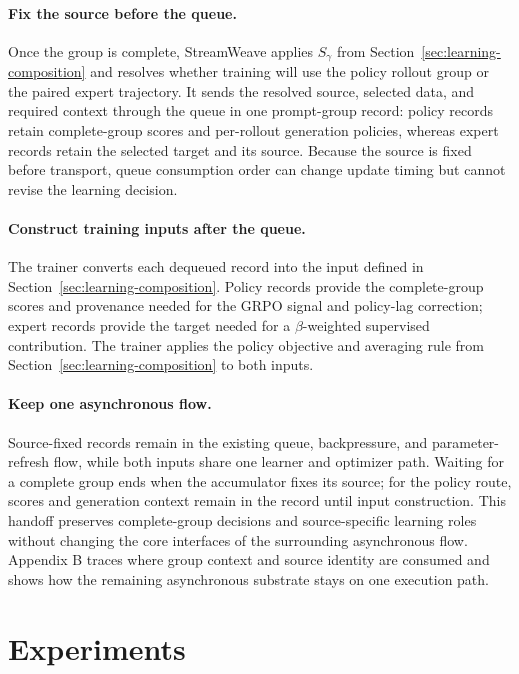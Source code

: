 \documentclass[letterpaper]{article}
\begin{document}
\paragraph{Fix the source before the queue.}
Once the group is complete, StreamWeave applies $S_\gamma$ from Section~\ref{sec:learning-composition} and resolves whether training will use the policy rollout group or the paired expert trajectory.
It sends the resolved source, selected data, and required context through the queue in one prompt-group record: policy records retain complete-group scores and per-rollout generation policies, whereas expert records retain the selected target and its source.
Because the source is fixed before transport, queue consumption order can change update timing but cannot revise the learning decision.

\paragraph{Construct training inputs after the queue.}
The trainer converts each dequeued record into the input defined in Section~\ref{sec:learning-composition}.
Policy records provide the complete-group scores and provenance needed for the GRPO signal and policy-lag correction; expert records provide the target needed for a $\beta$-weighted supervised contribution.
The trainer applies the policy objective and averaging rule from Section~\ref{sec:learning-composition} to both inputs.

\paragraph{Keep one asynchronous flow.}
Source-fixed records remain in the existing queue, backpressure, and parameter-refresh flow, while both inputs share one learner and optimizer path.
Waiting for a complete group ends when the accumulator fixes its source; for the policy route, scores and generation context remain in the record until input construction.
This handoff preserves complete-group decisions and source-specific learning roles without changing the core interfaces of the surrounding asynchronous flow.
Appendix B traces where group context and source identity are consumed and shows how the remaining asynchronous substrate stays on one execution path.

\section{Experiments}
\label{sec:experiments}
\end{document}

